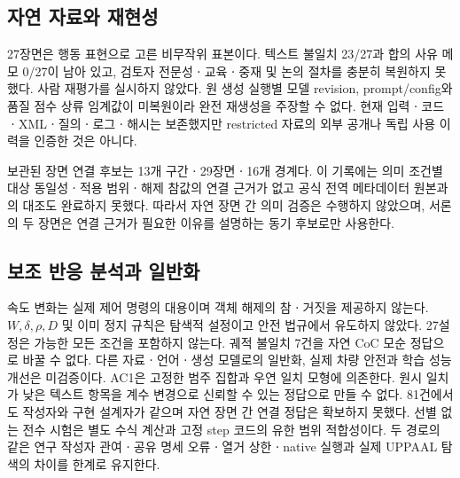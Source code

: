 \begin{revision}
\subsection{자연 자료와 재현성}
27장면은 행동 표현으로 고른 비무작위 표본이다. 텍스트 불일치 23/27과 합의 사유 메모 0/27이 남아 있고, 검토자 전문성ㆍ교육ㆍ중재 및 논의 절차를 충분히 복원하지 못했다. 사람 재평가를 실시하지 않았다. 원 생성 실행별 모델 revision, prompt/config와 품질 점수 상류 임계값이 미복원이라 완전 재생성을 주장할 수 없다. 현재 입력ㆍ코드ㆍXMLㆍ질의ㆍ로그ㆍ해시는 보존했지만 restricted 자료의 외부 공개나 독립 사용 이력을 인증한 것은 아니다.

보관된 장면 연결 후보는 13개 구간ㆍ29장면ㆍ16개 경계다. 이 기록에는 의미 조건별 대상 동일성ㆍ적용 범위ㆍ해제 참값의 연결 근거가 없고 공식 전역 메타데이터 원본과의 대조도 완료하지 못했다. 따라서 자연 장면 간 의미 검증은 수행하지 않았으며, 서론의 두 장면은 연결 근거가 필요한 이유를 설명하는 동기 후보로만 사용한다.

\subsection{보조 반응 분석과 일반화}
속도 변화는 실제 제어 명령의 대용이며 객체 해제의 참ㆍ거짓을 제공하지 않는다. $W,\delta,\rho,D$ 및 이미 정지 규칙은 탐색적 설정이고 안전 법규에서 유도하지 않았다. 27설정은 가능한 모든 조건을 포함하지 않는다. 궤적 불일치 7건을 자연 CoC 모순 정답으로 바꿀 수 없다. 다른 자료ㆍ언어ㆍ생성 모델로의 일반화, 실제 차량 안전과 학습 성능 개선은 미검증이다.
AC1은 고정한 범주 집합과 우연 일치 모형에 의존한다. 원시 일치가 낮은 텍스트 항목을 계수 변경으로 신뢰할 수 있는 정답으로 만들 수 없다. 81건에서도 작성자와 구현 설계자가 같으며 자연 장면 간 연결 정답은 확보하지 못했다. 선별 없는 전수 시험은 별도 수식 계산과 고정 step 코드의 유한 범위 적합성이다. 두 경로의 같은 연구 작성자 관여ㆍ공유 명세 오류ㆍ열거 상한ㆍnative 실행과 실제 UPPAAL 탐색의 차이를 한계로 유지한다.
\end{revision}
